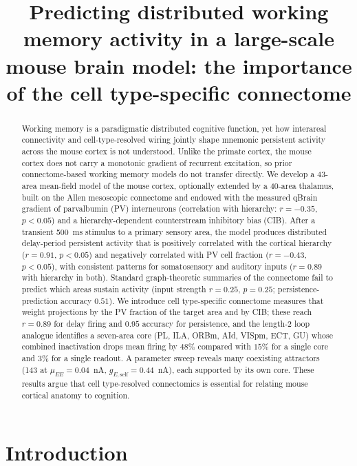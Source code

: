 \documentclass[11pt]{article}
\title{Predicting distributed working memory activity in a large-scale mouse brain model: the importance of the cell type-specific connectome}
\author{}
\date{}
\begin{document}
\maketitle

\begin{abstract}
Working memory is a paradigmatic distributed cognitive function, yet how interareal connectivity and cell-type-resolved wiring jointly shape mnemonic persistent activity across the mouse cortex is not understood. Unlike the primate cortex, the mouse cortex does not carry a monotonic gradient of recurrent excitation, so prior connectome-based working memory models do not transfer directly. We develop a 43-area mean-field model of the mouse cortex, optionally extended by a 40-area thalamus, built on the Allen mesoscopic connectome and endowed with the measured qBrain gradient of parvalbumin (PV) interneurons (correlation with hierarchy: $r=-0.35$, $p<0.05$) and a hierarchy-dependent counterstream inhibitory bias (CIB). After a transient 500~ms stimulus to a primary sensory area, the model produces distributed delay-period persistent activity that is positively correlated with the cortical hierarchy ($r=0.91$, $p<0.05$) and negatively correlated with PV cell fraction ($r=-0.43$, $p<0.05$), with consistent patterns for somatosensory and auditory inputs ($r=0.89$ with hierarchy in both). Standard graph-theoretic summaries of the connectome fail to predict which areas sustain activity (input strength $r=0.25$, $p=0.25$; persistence-prediction accuracy $0.51$). We introduce cell type-specific connectome measures that weight projections by the PV fraction of the target area and by CIB; these reach $r=0.89$ for delay firing and $0.95$ accuracy for persistence, and the length-2 loop analogue identifies a seven-area core (PL, ILA, ORBm, AId, VISpm, ECT, GU) whose combined inactivation drops mean firing by $48\%$ compared with $15\%$ for a single core and $3\%$ for a single readout. A parameter sweep reveals many coexisting attractors (143 at $\mu_{EE}=0.04$~nA, $g_{E,\text{self}}=0.44$~nA), each supported by its own core. These results argue that cell type-resolved connectomics is essential for relating mouse cortical anatomy to cognition.
\end{abstract}

\section{Introduction}
\end{document}
